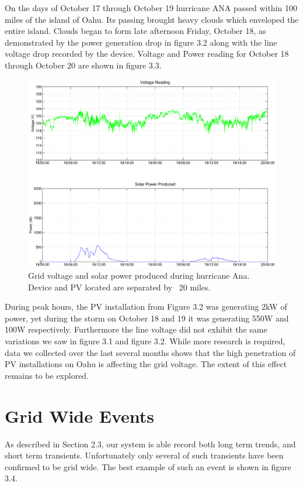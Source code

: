 On the days of October 17 through October 19 hurricane ANA passed within 100 miles of the island of Oahu. Its passing brought heavy clouds which enveloped the entire island. Clouds began to form 
late afternoon Friday, October 18, as demonstrated by the power generation drop in figure 3.2 along with the line voltage drop recorded by the device. Voltage and Power reading for
October 18 through October 20 are shown in figure 3.3.

\begin{figure}[h!]
\centering
\includegraphics[width=\textwidth]{img/Stormy.eps}
\caption{Grid voltage and solar power produced during hurricane Ana. Device and PV located are separated by ~20 miles.}
\label{fig:storm}
\end{figure} 

During peak hours, the PV installation from  Figure 3.2 was generating 2kW of power, yet during the storm on October 18 and 19 it was generating 550W and 100W respectively. Furthermore
the line voltage did not exhibit the same variations we saw in figure 3.1 and figure 3.2. While more research is required, data we collected over the last several months shows that the
high penetration of PV installations on Oahu is affecting the grid voltage. The extent of this effect remains to be explored.

\section{Grid Wide Events}

As described in Section 2.3, our system is able record both long term trends, and short term transients. Unfortunately only several of such transients have been confirmed to be grid wide.
The best example of such an event is shown in figure 3.4.

